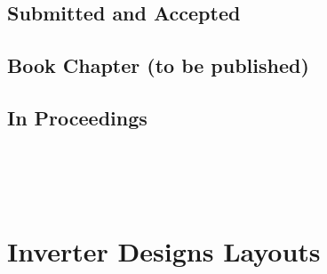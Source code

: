 \documentclass[diss,pgmicro,english]{iiufrgs}
\begin{document}
\section{Submitted and Accepted}


\section{Book Chapter (to be published)}



\section{In Proceedings}

 \\


 \\


 \\


\chapter{Inverter Designs Layouts}
\end{document}
